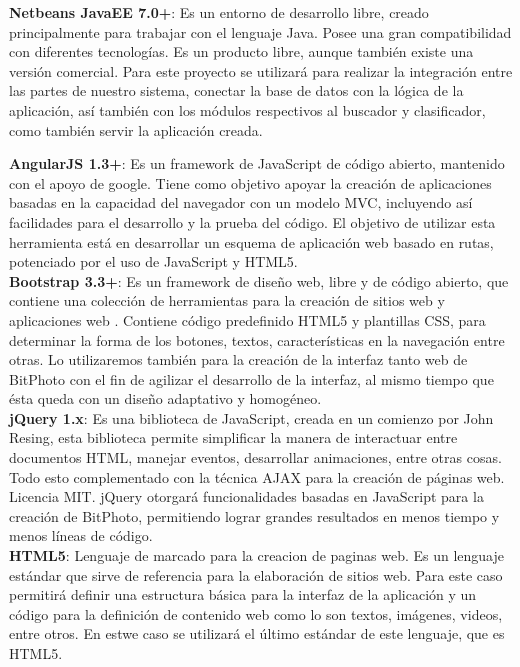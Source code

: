 \documentclass{memoria}
\begin{document}
\textbf{Netbeans JavaEE 7.0+}: Es un entorno de desarrollo libre, creado principalmente para trabajar con el lenguaje Java. Posee una gran compatibilidad con diferentes tecnologías. Es un producto libre, aunque también existe una versión comercial. Para este proyecto se utilizará para realizar la integración entre las partes de nuestro sistema, conectar la base de datos con la lógica de la aplicación, así también con los módulos respectivos al buscador y clasificador, como también servir la aplicación creada.\\


\textbf{AngularJS 1.3+}: Es un framework de JavaScript de código abierto, mantenido con el apoyo de google. Tiene como objetivo apoyar la creación de aplicaciones basadas en la capacidad del navegador con un modelo MVC, incluyendo así facilidades para el desarrollo y la prueba del código. El objetivo de utilizar esta herramienta está en desarrollar un esquema de aplicación web basado en rutas, potenciado por el uso de JavaScript y HTML5.\\

\textbf{Bootstrap 3.3+}: Es un framework de diseño web, libre y de código abierto, que contiene una colección de herramientas para la creación de sitios web y aplicaciones web . Contiene código predefinido HTML5 y plantillas CSS, para determinar la forma de los botones, textos, características en la navegación entre otras. Lo utilizaremos también para la creación de la interfaz tanto web de BitPhoto con el fin de agilizar el desarrollo de la interfaz, al mismo tiempo que ésta queda con un diseño adaptativo y homogéneo.\\

\textbf{jQuery 1.x}: Es una biblioteca de JavaScript, creada en un comienzo por John Resing, esta biblioteca permite simplificar la manera de interactuar entre documentos HTML, manejar eventos, desarrollar animaciones, entre otras cosas. Todo esto complementado con la técnica AJAX para la creación de páginas web. Licencia MIT. jQuery otorgará funcionalidades basadas en JavaScript para la creación de BitPhoto, permitiendo lograr grandes resultados en menos tiempo y menos líneas de código.\\

\textbf{HTML5}: Lenguaje de marcado para la creacion de paginas web. Es un lenguaje estándar que sirve de referencia para la elaboración de sitios web. Para este caso permitirá definir una estructura básica para la interfaz de la aplicación y un código para la definición de contenido web como lo son textos, imágenes, videos, entre otros. En estwe caso se utilizará el último estándar de este lenguaje, que es HTML5.\\
\end{document}

